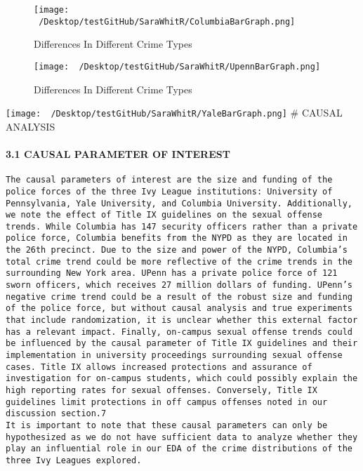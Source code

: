\documentclass[
]{article}
\begin{document}
\begin{figure}
\centering
\texttt{[image: ~/Desktop/testGitHub/SaraWhitR/ColumbiaBarGraph.png]}
\caption{Differences In Different Crime Types}
\end{figure}

\begin{figure}
\centering
\texttt{[image: ~/Desktop/testGitHub/SaraWhitR/UpennBarGraph.png]}
\caption{Differences In Different Crime Types}
\end{figure}

\texttt{[image: ~/Desktop/testGitHub/SaraWhitR/YaleBarGraph.png]} \#
CAUSAL ANALYSIS

\hypertarget{causal-parameter-of-interest}{%
\paragraph{3.1 CAUSAL PARAMETER OF
INTEREST}\label{causal-parameter-of-interest}}

\begin{verbatim}
The causal parameters of interest are the size and funding of the police forces of the three Ivy League institutions: University of Pennsylvania, Yale University, and Columbia University. Additionally, we note the effect of Title IX guidelines on the sexual offense trends. While Columbia has 147 security officers rather than a private police force, Columbia benefits from the NYPD as they are located in the 26th precinct. Due to the size and power of the NYPD, Columbia’s total crime trend could be more reflective of the crime trends in the surrounding New York area. UPenn has a private police force of 121 sworn officers, which receives 27 million dollars of funding. UPenn’s negative crime trend could be a result of the robust size and funding of the police force, but without causal analysis and true experiments that include randomization, it is unclear whether this external factor has a relevant impact. Finally, on-campus sexual offense trends could be influenced by the causal parameter of Title IX guidelines and their implementation in university proceedings surrounding sexual offense cases. Title IX allows increased protections and assurance of investigation for on-campus students, which could possibly explain the high reporting rates for sexual offenses. Conversely, Title IX guidelines limit protections in off campus offenses noted in our discussion section.7 
It is important to note that these causal parameters can only be hypothesized as we do not have sufficient data to analyze whether they play an influential role in our EDA of the crime distributions of the three Ivy Leagues explored. 
\end{verbatim}
\end{document}
